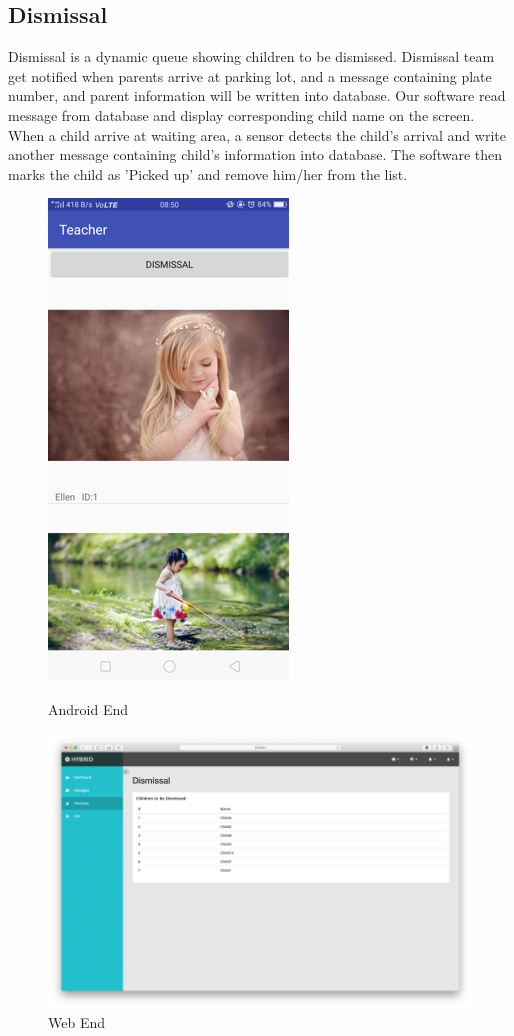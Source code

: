 \documentclass{article}
\begin{document}
\subsection{Dismissal}
Dismissal is a dynamic queue showing children to be dismissed. Dismissal team get notified when parents arrive at parking lot, and a message containing plate number, and parent information will be written into database. Our software read message from database and display corresponding child name on the screen. When a child arrive at waiting area, a sensor detects the child's arrival and write another message containing child's information into database. The software then marks the child as 'Picked up' and remove him/her from the list.
 	\begin{figure}[H] 	
 		\begin{minipage}[b]{0.28\linewidth}
		 	\centering
	 		\includegraphics{img/dismissal1.png}
 			\caption{Android End}
 		\end{minipage}
 		\begin{minipage}[b]{0.68\linewidth} 		
 	 		\centering
 		\includegraphics[width=\linewidth]{img/dismissal2.png}
 		\caption{Web End}
	 	\end{minipage}
 	\end{figure}
 	
\end{document}
